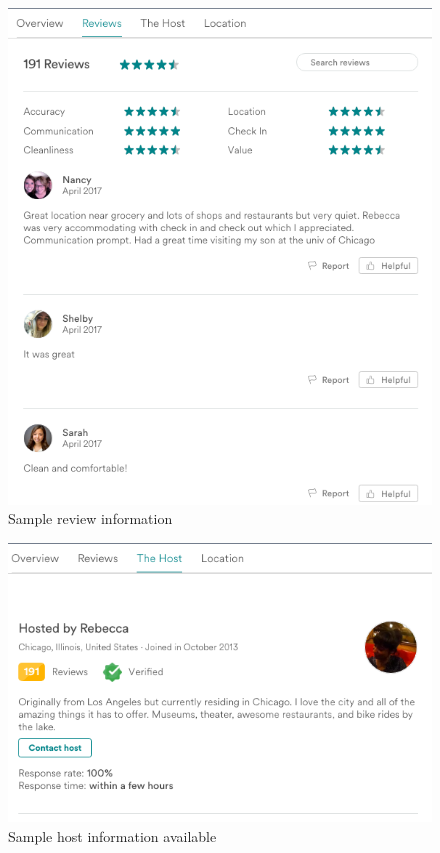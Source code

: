 \begin{figure}[!ht]\centering
\includegraphics[width=.8\textwidth]{figures/sample3-reviews}
\caption{Sample review information}
	\label{fig:reviewinfo}
\end{figure}
\begin{figure}\centering
\includegraphics[width=.9\textwidth]{figures/sample4-host}
\caption[Sample host information]{Sample host information available}
	\label{fig:host}
\end{figure}
